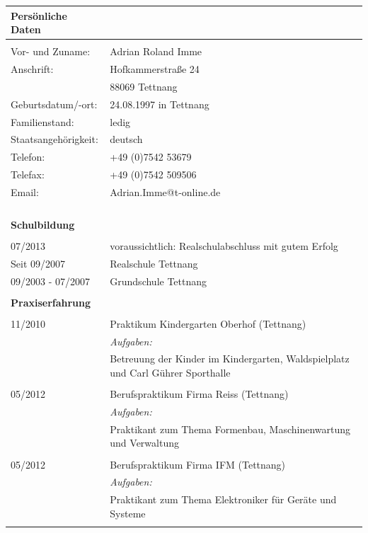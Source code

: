 \documentclass[12pt, german]{g-brief}
\begin{document}
\vspace{1cm}
\begin{tabular}{l p{9.4cm}}
\\{\bf Persönliche Daten}& \\
\hline
 & \\
Vor- und Zuname: 	&	Adrian Roland Imme\\
Anschrift: 			&	Hofkammerstraße 24\\
					&	88069 Tettnang\\
Geburtsdatum/-ort:	&	24.08.1997 in Tettnang\\
Familienstand:		&	ledig\\
Staatsangehörigkeit:  &	deutsch\\
Telefon:			&	+49 (0)7542 53679\\
Telefax: 			&	+49 (0)7542 509506\\
Email:				&	Adrian.Imme@t-online.de\\
 & \\
 \\
 \\
 \\
{\bf Schulbildung}& \\
\hline
 & \\

07/2013 			&	voraussichtlich: Realschulabschluss mit gutem Erfolg\\
Seit 09/2007 		&	Realschule Tettnang\\
09/2003 - 07/2007	&	Grundschule Tettnang\\
 & \\
{\bf Praxiserfahrung} & \\
\hline
 & \\
11/2010 & Praktikum Kindergarten Oberhof (Tettnang)\\
 & \textit{Aufgaben:} \\
 & Betreuung der Kinder im Kindergarten, Waldspielplatz und Carl Gührer
 Sporthalle \\ 
 & \\ 
 05/2012 & Berufspraktikum Firma Reiss (Tettnang)\\
 & \textit{Aufgaben:} \\
 & Praktikant zum Thema Formenbau, Maschinenwartung und Verwaltung\\
 & \\
 05/2012 & Berufspraktikum Firma IFM (Tettnang)\\
 & \textit{Aufgaben:} \\
 & Praktikant zum Thema Elektroniker für Geräte und Systeme\\
 & \\
 \end{tabular}
 
\end{document}
